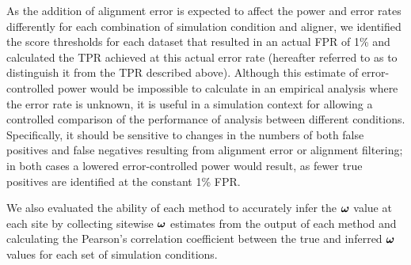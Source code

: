\documentclass{mbe}
\begin{document}
As the addition of alignment error is expected to affect the power and
error rates differently for each combination of simulation condition
and aligner, we identified the score thresholds for each dataset that
resulted in an actual FPR of 1\% and calculated the TPR achieved at
this actual error rate (hereafter referred to as \tpr{} to distinguish
it from the TPR described above). Although this estimate of
error-controlled power would be impossible to calculate in an
empirical analysis where the error rate is unknown, it is useful in a
simulation context for allowing a controlled comparison of the
performance of \sw analysis between different
conditions. Specifically, it should be sensitive to changes in the
numbers of both false positives and false negatives resulting from
alignment error or alignment filtering; in both cases a lowered
error-controlled power would result, as fewer true positives are
identified at the constant 1\% FPR.

We also evaluated the ability of each method to accurately infer the
$\bm{\omega}$ value at each site by collecting sitewise $\bm{\omega}$ estimates from
the output of each method and calculating the Pearson's correlation
coefficient between the true and inferred $\bm{\omega}$ values for each set
of simulation conditions.
\end{document}

